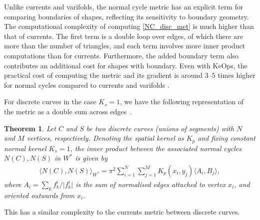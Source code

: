 \documentclass[sn-mathphys-num]{sn-jnl}%
\theoremstyle{thmstyleone}%
\newtheorem{thm}[theorem]{Theorem}
\theoremstyle{thmstyletwo}%
\theoremstyle{thmstylethree}%
\numberwithin{remark}{section}
\numberwithin{definition}{section}
\numberwithin{equation}{section}
\numberwithin{theorem}{section}
\begin{document}
 Unlike currents and varifolds, the normal cycle metric has an explicit term for comparing boundaries of shapes, reflecting its sensitivity to boundary geometry.  The computational complexity of computing \cref{NC_disc_met} is much higher than that of currents. The first term is a double loop over edges, of which there are more than the number of triangles, and each term involves more inner product computations than for currents. Furthermore, the added boundary term also contributes an additional cost for shapes with boundary. Even with KeOps, the practical cost of computing the metric and its gradient is around $3$--$5$ times higher for normal cycles compared to currents and varifolds \cite{NCpaper}.  

For discrete curves in the case $K_s=1$, we have the following representation of the metric as a double sum across edges~\cite{NCThesis}.
\begin{thm}
    Let $C$ and $S$ be two discrete curves (unions of segments) with $N$ and $M$ vertices, respectively. Denoting the spatial kernel as $K_{p}$ and fixing constant normal kernel $K_{s}=1$, the inner product between the associated normal cycles $N(C), N(S)$ in $W^{*}$ is given by
    \begin{align}\label{NCCURVEMET}
        \langle N(C), N(S) \rangle_{W^{*}} = {\pi^{2}}{}{\sum_{i=1}^{N}\sum_{j=1}^{M}{K_{p}(x_{i},y_{j})}\langle A_{i},B_{j}\rangle }, 
    \end{align}
    where $A_{i} = \sum_{k}{f_{k}^{i}/\lvert f_{k}^{i}\rvert}$ is the sum of normalised edges attached to vertex $x_{i}$, and oriented outwards from $x_{i}$.
\end{thm}
 This has a similar complexity to the currents metric between discrete curves.
\end{document}
